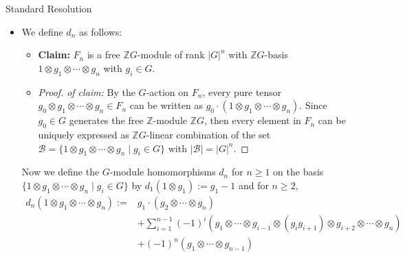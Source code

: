 \begin{definition}{Standard Resolution}
\begin{itemize}
    \item We define $d_n$ as follows:
    \begin{itemize}
        \item \textbf{Claim:} $F_n$ is a free $\mathbb{Z}G$-module of rank $|G|^n$ with $\mathbb{Z}G$-basis $1\otimes g_1\otimes \cdots \otimes g_n$ with $g_i\in G$.
        \item \begin{proof}
            \textit{of claim:} By the $G$-action on $F_n$, every pure tensor $g_0\otimes g_1 \otimes \cdots \otimes g_n \in F_n$ can be written as $g_0 \cdot (1 \otimes g_1\otimes \cdots \otimes g_n)$. Since $g_0\in G$ generates the free $\mathbb{Z}$-module $\mathbb{Z}
            G$, then every element in $F_n$ can be uniquely expressed as $\mathbb{Z}G$-linear combination of the set $\mathcal{B}= \{1\otimes g_1 \otimes \cdots \otimes g_n \mid g_i \in G\}$ with $|\mathcal{B}|= |G|^n$.
        \end{proof}
    \end{itemize}
    Now we define the $G$-module homomorphisms $d_n$ for $n\geq 1$ on the basis $\{1\otimes g_1\otimes \cdots \otimes g_n\mid g_i\in G\}$ by $d_1(1\otimes g_1):= g_1-1$ and for $n\geq 2$,
    \begin{align*}
        d_n(1 \otimes g_1\otimes \cdots \otimes g_n) := &g_1 \cdot (g_2 \otimes \cdots \otimes g_n)\\
        &+ \sum_{i=1}^{n-1} (-1)^i (g_1 \otimes \cdots \otimes g_{i-1} \otimes (g_ig_{i+1}) \otimes g_{i+2} \otimes \cdots \otimes g_n)\\
        &+(-1)^n (g_1 \otimes \cdots \otimes g_{n-1})
    \end{align*}
\end{itemize}
\end{definition}

